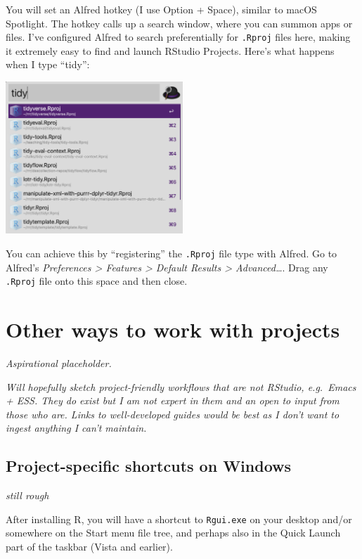 \documentclass[
  letterpaper,
]{book}
\begin{document}
You will set an Alfred hotkey (I use Option + Space), similar to macOS
Spotlight. The hotkey calls up a search window, where you can summon
apps or files. I've configured Alfred to search preferentially for
\texttt{.Rproj} files here, making it extremely easy to find and launch
RStudio Projects. Here's what happens when I type ``tidy'':

\includegraphics[width=0.5\textwidth,height=\textheight]{./img/alfred-tidy.png}

You can achieve this by ``registering'' the \texttt{.Rproj} file type
with Alfred. Go to Alfred's \emph{Preferences \textgreater{} Features
\textgreater{} Default Results \textgreater{} Advanced\ldots{}}. Drag
any \texttt{.Rproj} file onto this space and then close.

\hypertarget{other-ways-to-work-with-projects}{%
\section{Other ways to work with
projects}\label{other-ways-to-work-with-projects}}

\emph{Aspirational placeholder.}

\emph{Will hopefully sketch project-friendly workflows that are not
RStudio, e.g.~Emacs + ESS. They do exist but I am not expert in them and
an open to input from those who are. Links to well-developed guides
would be best as I don't want to ingest anything I can't maintain.}

\hypertarget{project-specific-shortcuts-on-windows}{%
\subsection{Project-specific shortcuts on
Windows}\label{project-specific-shortcuts-on-windows}}

\emph{still rough}

After installing R, you will have a shortcut to \texttt{Rgui.exe} on
your desktop and/or somewhere on the Start menu file tree, and perhaps
also in the Quick Launch part of the taskbar (Vista and earlier).
\end{document}
